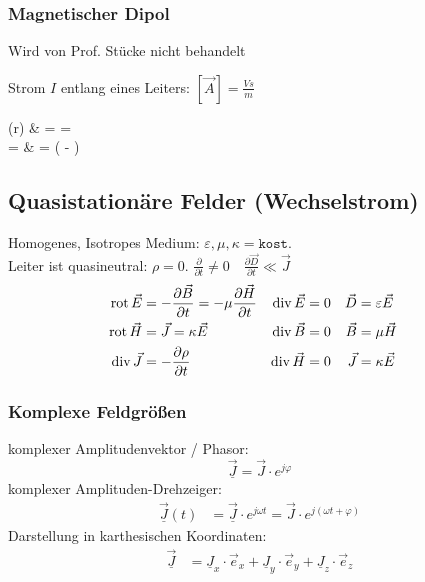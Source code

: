 	\subsubsection{Magnetischer Dipol}
		{\footnotesize Wird von Prof. Stücke nicht behandelt}
		

		Strom $I$ entlang eines Leiters: $\left[\vec{A}\right] = \frac{Vs}{m}$
		\begin{flalign*}
			(r)                      & =  \int {} =   \\
			 = \nabla \times {} & =  \left( - \right)
		\end{flalign*}

\subsection{Quasistationäre Felder (Wechselstrom)}
	Homogenes, Isotropes Medium: $ \varepsilon, \mu, \kappa = \mathtt{kost.} $\\
	Leiter ist quasineutral: $ \rho = 0 $. \(\frac{\partial}{\partial t} \ne 0 \quad \frac{\partial \vec{D}}{\partial t} \ll \vec{J}\)
	\begin{align*}
		\operatorname{rot} \vec{E} & = -\frac{\partial \vec{B}}{\partial t} = -\mu \frac{\partial \vec{H}}{\partial t} & \operatorname{div} \vec{E} & = 0 & \vec{D} & = \varepsilon\vec{E} & \\
		\operatorname{rot} \vec{H} & = \vec{J} = \kappa \vec{E}                                                        & \operatorname{div} \vec{B} & = 0 & \vec{B} & = \mu\vec{H}         & \\
		\operatorname{div} \vec{J} & = -\frac{\partial \rho}{\partial t}                                               & \operatorname{div} \vec{H} & = 0 & \vec{J} & = \kappa \vec{E}     &
	\end{align*}

	\subsubsection{Komplexe Feldgrößen}
	\textbullet komplexer Amplitudenvektor / Phasor:
	\begin{equation*}
		\underline{\vec{J}}=\vec{J}\cdot e^{j\varphi}
	\end{equation*}
	\textbullet komplexer Amplituden-Drehzeiger:
	\begin{align*}
		\underline{\vec{J}}(t) & =\underline{\vec{J}} \cdot e ^{j\omega t} = \vec{J} \cdot e^{j(\omega t+\varphi)}
	\end{align*}
	\textbullet Darstellung in karthesischen Koordinaten:
	\begin{align*}
		\underline{\vec{J}} & =\underline{J}_x \cdot \vec{e}_x + \underline{J}_y \cdot \vec{e}_y + \underline{J}_z \cdot \vec{e}_z
	\end{align*}

